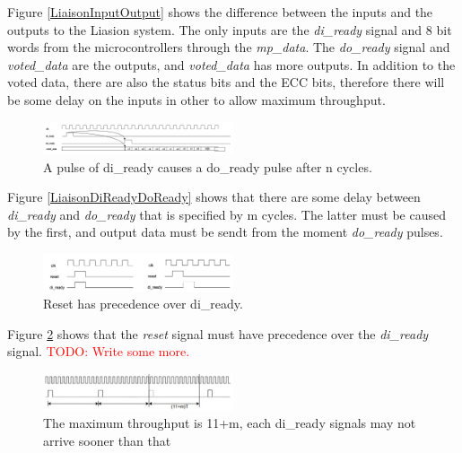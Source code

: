 \documentclass[a4paper]{IEEEtran}
\newcommand\TODO[1]{\textcolor{red}{TODO:#1}}
\newcommand\todo[1]{\TODO{#1}}
\begin{document}
Figure \ref{LiaisonInputOutput} shows the difference between the inputs and the outputs to the Liasion system. The only inputs are the \textit{di\_ready} signal and 8 bit words from the microcontrollers through the \textit{mp\_data}. The \textit{do\_ready} signal and \textit{voted\_data} are the outputs, and \textit{voted\_data} has more outputs. In addition to the voted data, there are also the status bits and the ECC bits, therefore there will be some delay on the inputs in other to allow maximum throughput. 

\begin{figure}[h!]
  \centering
      \includegraphics[width=0.5\textwidth]{Figures/ProjectDescription/LiaisonDiReadyDoReady}
  \caption{A pulse of di\_ready causes a do\_ready pulse after n cycles.}
  \label{fig:LiaisonDiReadyDoReady}
\end{figure}

Figure \ref{LiaisonDiReadyDoReady} shows that there are some delay between \textit{di\_ready} and \textit{do\_ready} that is specified by m cycles. The latter must be caused by the first, and output data must be sendt from the moment \textit{do\_ready} pulses.

\begin{figure}[h!]
  \centering
      \includegraphics[width=0.5\textwidth]{Figures/ProjectDescription/LiaisonResetDiReady}
  \caption{Reset has precedence over di\_ready.}
  \label{fig:LiaisonResetDiReady}
\end{figure}

Figure \ref{fig:LiaisonResetDiReady} shows that the \textit{reset} signal must have precedence over the \textit{di\_ready} signal. \todo{ Write some more.}

\begin{figure}[h!]
  \centering
      \includegraphics[width=0.5\textwidth]{Figures/ProjectDescription/LiaisonMaxThroughput}
  \caption{The maximum throughput is 11+m, each di\_ready signals may not arrive sooner than that}
  \label{fig:LiaisonMaxThroughput}
\end{figure}
\end{document}
